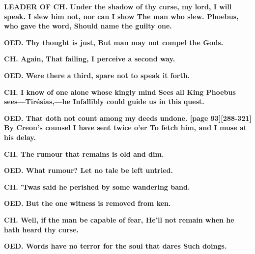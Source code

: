 \documentclass[11pt,letter]{book}
\begin{document}
\par \textbf{LEADER OF CH. Under the shadow of thy curse, my lord, I will speak. I slew him not, nor can I show The man who slew. Phoebus, who gave the word, Should name the guilty one.}
\par 

\par \textbf{OED. Thy thought is just, But man may not compel the Gods.}
\par 

\par \textbf{CH. Again, That failing, I perceive a second way.}
\par 

\par \textbf{OED. Were there a third, spare not to speak it forth.}
\par 

\par \textbf{CH. I know of one alone whose kingly mind Sees all King Phoebus sees—Tirésias,—he Infallibly could guide us in this quest.}
\par 

\par \textbf{OED. That doth not count among my deeds undone. [page 93][288-321] By Creon’s counsel I have sent twice o’er To fetch him, and I muse at his delay.}
\par 

\par \textbf{CH. The rumour that remains is old and dim.}
\par 

\par \textbf{OED. What rumour? Let no tale be left untried.}
\par 

\par \textbf{CH. ’Twas said he perished by some wandering band.}
\par 

\par \textbf{OED. But the one witness is removed from ken.}
\par 

\par \textbf{CH. Well, if the man be capable of fear, He’ll not remain when he hath heard thy curse.}
\par 

\par \textbf{OED. Words have no terror for the soul that dares Such doings.}
\par 
\end{document}
